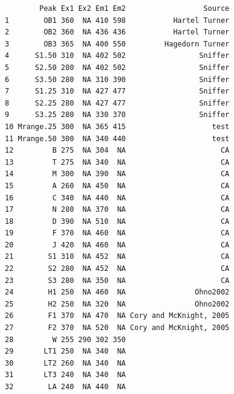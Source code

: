 \documentclass[a4paper,11pt]{article}\usepackage[]{graphicx}\usepackage[]{color}
\makeatletter
\newenvironment{kframe}{%
 \def\at@end@of@kframe{}%
 \ifinner\ifhmode%
  \def\at@end@of@kframe{\end{minipage}}%
  \begin{minipage}{\columnwidth}%
 \fi\fi%
 \def\FrameCommand##1{\hskip\@totalleftmargin \hskip-\fboxsep
 \colorbox{shadecolor}{##1}\hskip-\fboxsep
     \hskip-\linewidth \hskip-\@totalleftmargin \hskip\columnwidth}%
 \MakeFramed {\advance\hsize-\width
   \@totalleftmargin\z@ \linewidth\hsize
   \@setminipage}}%
 {\par\unskip\endMakeFramed%
 \at@end@of@kframe}
\newenvironment{knitrout}{}{} %
\makeatother
\begin{document}
\begin{knitrout}
\color{fgcolor}\begin{kframe}
\begin{verbatim}
        Peak Ex1 Ex2 Em1 Em2                  Source
1        OB1 360  NA 410 598           Hartel Turner
2        OB2 360  NA 436 436           Hartel Turner
3        OB3 365  NA 400 550         Hagedorn Turner
4      S1.50 310  NA 402 502                 Sniffer
5      S2.50 280  NA 402 502                 Sniffer
6      S3.50 280  NA 310 390                 Sniffer
7      S1.25 310  NA 427 477                 Sniffer
8      S2.25 280  NA 427 477                 Sniffer
9      S3.25 280  NA 330 370                 Sniffer
10 Mrange.25 300  NA 365 415                    test
11 Mrange.50 300  NA 340 440                    test
12         B 275  NA 304  NA                      CA
13         T 275  NA 340  NA                      CA
14         M 300  NA 390  NA                      CA
15         A 260  NA 450  NA                      CA
16         C 340  NA 440  NA                      CA
17         N 280  NA 370  NA                      CA
18         D 390  NA 510  NA                      CA
19         F 370  NA 460  NA                      CA
20         J 420  NA 460  NA                      CA
21        S1 310  NA 452  NA                      CA
22        S2 280  NA 452  NA                      CA
23        S3 280  NA 350  NA                      CA
24        H1 250  NA 460  NA                Ohno2002
25        H2 250  NA 320  NA                Ohno2002
26        F1 370  NA 470  NA Cory and McKnight, 2005
27        F2 370  NA 520  NA Cory and McKnight, 2005
28         W 255 290 302 350                        
29       LT1 250  NA 340  NA                        
30       LT2 260  NA 340  NA                        
31       LT3 240  NA 340  NA                        
32        LA 240  NA 440  NA                        
\end{verbatim}
\end{kframe}
\end{knitrout}

\end{document}

